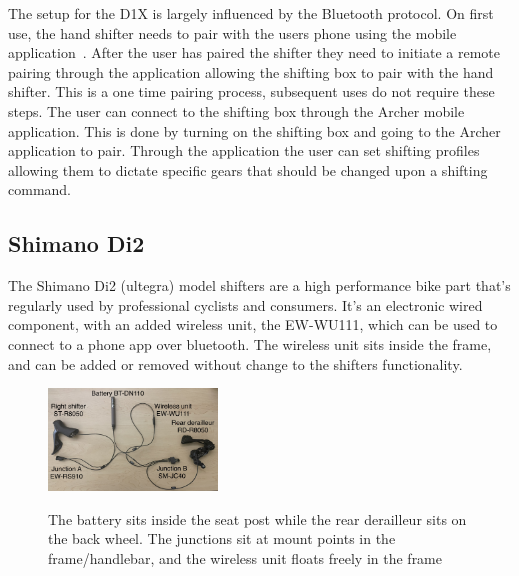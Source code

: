 \documentclass[letterpaper,twocolumn,10pt]{article}
\begin{document}
The setup for the D1X is largely influenced by the Bluetooth protocol. On first use, the hand shifter needs to pair with the users phone using the mobile application~\cite{ArcherApp}. After the user has paired the shifter they need to initiate a remote pairing through the application allowing the shifting box to pair with the hand shifter. This is a one time pairing process, subsequent uses do not require these steps. The user can connect to the shifting box through the Archer mobile application. This is done by turning on the shifting box and going to the Archer application to pair. Through the application the user can set shifting profiles allowing them to dictate specific gears that should be changed upon a shifting command. 

\subsection{Shimano Di2}

The Shimano Di2 (ultegra) model shifters are a high performance bike part that's regularly used by professional cyclists and consumers. It's an electronic wired component, with an added wireless unit, the EW-WU111, which can be used to connect to a phone app over bluetooth. The wireless unit sits inside the frame, and can be added or removed without change to the shifters functionality.

\begin{figure}[ht]
\begin{center}
\centering
\includegraphics[width=0.4\textwidth]{images/IMG_5264_Di2.jpg}
\label{fig:Di2Setup}
\end{center}
\caption{The battery sits inside the seat post while the rear derailleur sits on the back wheel. The junctions sit at mount points in the frame/handlebar, and the wireless unit floats freely in the frame}
\end{figure}
\end{document}
